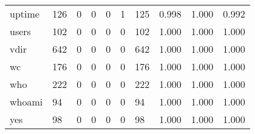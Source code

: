 \begin{longtable}{lp{1.3cm}p{1.3cm}p{1.3cm}p{1.3cm}p{1.3cm}p{1.3cm}p{1.3cm}p{1.3cm}p{1.3cm}}
uptime    &                    126 &                                  0 &                                 0 &                                0 &                                 1 &                             125 &                                0.998 &                                  1.000 &                                0.992 \\
users     &                    102 &                                  0 &                                 0 &                                0 &                                 0 &                             102 &                                1.000 &                                  1.000 &                                1.000 \\
vdir      &                    642 &                                  0 &                                 0 &                                0 &                                 0 &                             642 &                                1.000 &                                  1.000 &                                1.000 \\
wc        &                    176 &                                  0 &                                 0 &                                0 &                                 0 &                             176 &                                1.000 &                                  1.000 &                                1.000 \\
who       &                    222 &                                  0 &                                 0 &                                0 &                                 0 &                             222 &                                1.000 &                                  1.000 &                                1.000 \\
whoami    &                     94 &                                  0 &                                 0 &                                0 &                                 0 &                              94 &                                1.000 &                                  1.000 &                                1.000 \\
yes       &                     98 &                                  0 &                                 0 &                                0 &                                 0 &                              98 &                                1.000 &                                  1.000 &                                1.000 \\
\end{longtable}
